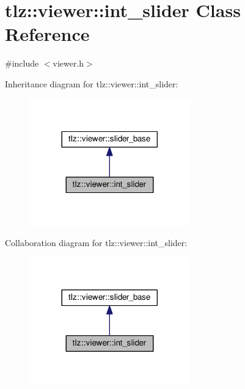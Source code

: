 \hypertarget{classtlz_1_1viewer_1_1int__slider}{}\section{tlz\+:\+:viewer\+:\+:int\+\_\+slider Class Reference}
\label{classtlz_1_1viewer_1_1int__slider}


{\ttfamily \#include $<$viewer.\+h$>$}



Inheritance diagram for tlz\+:\+:viewer\+:\+:int\+\_\+slider\+:
\nopagebreak
\begin{figure}[H]
\begin{center}
\leavevmode
\includegraphics[width=197pt]{classtlz_1_1viewer_1_1int__slider__inherit__graph}
\end{center}
\end{figure}


Collaboration diagram for tlz\+:\+:viewer\+:\+:int\+\_\+slider\+:
\nopagebreak
\begin{figure}[H]
\begin{center}
\leavevmode
\includegraphics[width=197pt]{classtlz_1_1viewer_1_1int__slider__coll__graph}
\end{center}
\end{figure}
